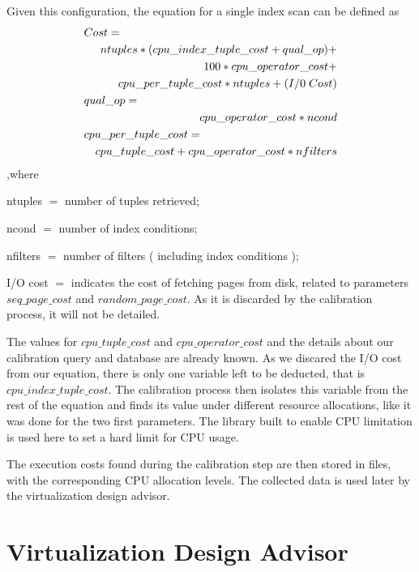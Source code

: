 Given this configuration, the equation for a single index scan can be defined as
\begin{eqnarray*}
  \lefteqn{Cost=} \\
  &&ntuples * ( cpu\_index\_tuple\_cost + qual\_op ) + \\
  &&100*cpu\_operator\_cost + \\
  &&cpu\_per\_tuple\_cost * ntuples + ( I/0\;Cost ) \\
  \lefteqn{qual\_op=} \\
  &&cpu\_operator\_cost * ncond \\
  \lefteqn{cpu\_per\_tuple\_cost=} \\
  &&cpu\_tuple\_cost + cpu\_operator\_cost * nfilters
\end{eqnarray*}
,where
\begin{description}
 \item ntuples $=$ number of tuples retrieved;
 \item ncond $=$ number of index conditions;
 \item nfilters $=$ number of filters ( including index conditions );
 \item I/O cost $=$ indicates the cost of fetching pages from disk, related to parameters $seq\_page\_cost$ and $random\_page\_cost$. As it is discarded by the calibration process, it will not be detailed.
\end{description}

The values for $cpu\_tuple\_cost$ and $cpu\_operator\_cost$ and the details about our calibration query and database are already known. As we discared the I/O cost from our equation, there is only one variable left to be deducted, that is $cpu\_index\_tuple\_cost$. The calibration process then isolates this variable from the rest of the equation and finds its value under different resource allocations, like it was done for the two first parameters. The library built to enable CPU limitation is used here to set a hard limit for CPU usage.

The execution costs found during the calibration step are then stored in files, with the corresponding CPU allocation levels. The collected data is used later by the virtualization design advisor. 

\section{Virtualization Design Advisor}

